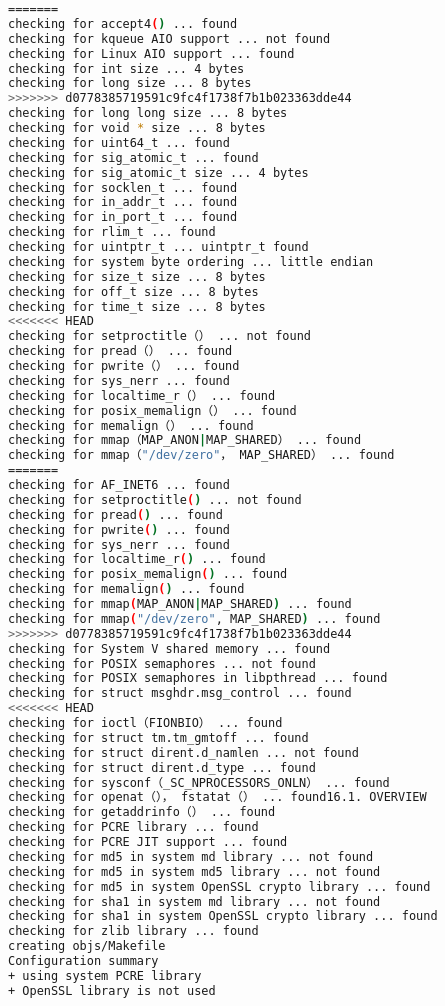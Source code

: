 \begin{lstlisting}[language=bash]
=======
checking for accept4() ... found
checking for kqueue AIO support ... not found
checking for Linux AIO support ... found
checking for int size ... 4 bytes
checking for long size ... 8 bytes
>>>>>>> d0778385719591c9fc4f1738f7b1b023363dde44
checking for long long size ... 8 bytes
checking for void * size ... 8 bytes
checking for uint64_t ... found
checking for sig_atomic_t ... found
checking for sig_atomic_t size ... 4 bytes
checking for socklen_t ... found
checking for in_addr_t ... found
checking for in_port_t ... found
checking for rlim_t ... found
checking for uintptr_t ... uintptr_t found
checking for system byte ordering ... little endian
checking for size_t size ... 8 bytes
checking for off_t size ... 8 bytes
checking for time_t size ... 8 bytes
<<<<<<< HEAD
checking for setproctitle（） ... not found
checking for pread（） ... found
checking for pwrite（） ... found
checking for sys_nerr ... found
checking for localtime_r（） ... found
checking for posix_memalign（） ... found
checking for memalign（） ... found
checking for mmap（MAP_ANON|MAP_SHARED） ... found
checking for mmap（"/dev/zero"， MAP_SHARED） ... found
=======
checking for AF_INET6 ... found
checking for setproctitle() ... not found
checking for pread() ... found
checking for pwrite() ... found
checking for sys_nerr ... found
checking for localtime_r() ... found
checking for posix_memalign() ... found
checking for memalign() ... found
checking for mmap(MAP_ANON|MAP_SHARED) ... found
checking for mmap("/dev/zero", MAP_SHARED) ... found
>>>>>>> d0778385719591c9fc4f1738f7b1b023363dde44
checking for System V shared memory ... found
checking for POSIX semaphores ... not found
checking for POSIX semaphores in libpthread ... found
checking for struct msghdr.msg_control ... found
<<<<<<< HEAD
checking for ioctl（FIONBIO） ... found
checking for struct tm.tm_gmtoff ... found
checking for struct dirent.d_namlen ... not found
checking for struct dirent.d_type ... found
checking for sysconf（_SC_NPROCESSORS_ONLN） ... found
checking for openat（）， fstatat（） ... found16.1. OVERVIEW
checking for getaddrinfo（） ... found
checking for PCRE library ... found
checking for PCRE JIT support ... found
checking for md5 in system md library ... not found
checking for md5 in system md5 library ... not found
checking for md5 in system OpenSSL crypto library ... found
checking for sha1 in system md library ... not found
checking for sha1 in system OpenSSL crypto library ... found
checking for zlib library ... found
creating objs/Makefile
Configuration summary
+ using system PCRE library
+ OpenSSL library is not used

\end{lstlisting}
